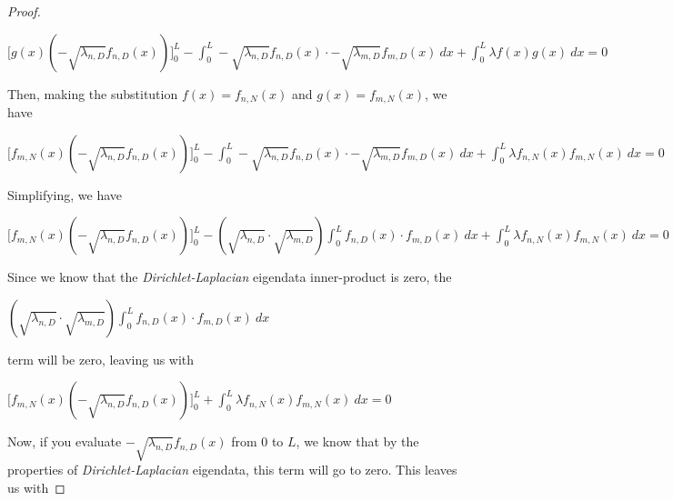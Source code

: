 \documentclass[executivepaper]{article}
\begin{document}
\begin{flushleft}
\begin{proof}
\begin{center}

$\bigg[g(x) (-\sqrt{\lambda_{n,D}} f_{n,D}(x))\bigg]_{0}^{L} - \int_{0}^{L} -\sqrt{\lambda_{n,D}} f_{n,D}(x) \cdot -\sqrt{\lambda_{m,D}} f_{m,D}(x) \ dx + \int_{0}^{L} \lambda f(x)g(x) \ dx=0$

\end{center}

Then, making the substitution $f(x)=f_{n,N}(x)$ and $g(x)=f_{m,N}(x)$, we have

\begin{center}

$\bigg[f_{m,N}(x) (-\sqrt{\lambda_{n,D}} f_{n,D}(x))\bigg]_{0}^{L} - \int_{0}^{L} -\sqrt{\lambda_{n,D}} f_{n,D}(x) \cdot -\sqrt{\lambda_{m,D}} f_{m,D}(x) \ dx + \int_{0}^{L} \lambda f_{n,N}(x)f_{m,N}(x) \ dx=0$

\end{center}

Simplifying, we have

\begin{center}

$\bigg[f_{m,N}(x) (-\sqrt{\lambda_{n,D}} f_{n,D}(x))\bigg]_{0}^{L} -(\sqrt{\lambda_{n,D}} \cdot \sqrt{\lambda_{m,D}}) \int_{0}^{L} f_{n,D}(x) \cdot  f_{m,D}(x) \ dx + \int_{0}^{L} \lambda f_{n,N}(x)f_{m,N}(x) \ dx=0$

\end{center}

Since we know that the \textit{Dirichlet-Laplacian} eigendata inner-product is zero, the

\begin{center}

$(\sqrt{\lambda_{n,D}} \cdot \sqrt{\lambda_{m,D}}) \int_{0}^{L} f_{n,D}(x) \cdot  f_{m,D}(x) \ dx$

\end{center}

term will be zero, leaving us with

\begin{center}

$\bigg[f_{m,N}(x) (-\sqrt{\lambda_{n,D}} f_{n,D}(x))\bigg]_{0}^{L} + \int_{0}^{L} \lambda f_{n,N}(x)f_{m,N}(x) \ dx=0$

\end{center}

Now, if you evaluate $-\sqrt{\lambda_{n,D}} f_{n,D}(x)$ from $0$ to $L$, we know that by the properties of \textit{Dirichlet-Laplacian} eigendata, this term will go to zero. This leaves us with


\end{proof}
\end{flushleft}
\end{document}
